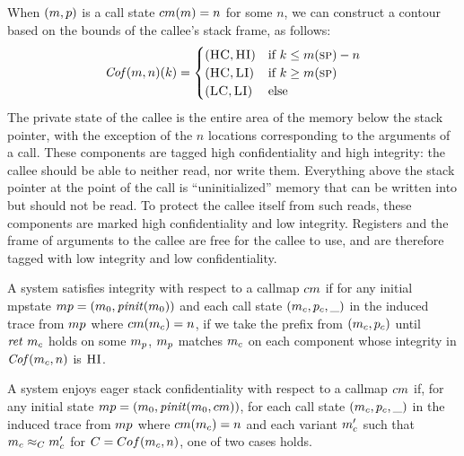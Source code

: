 \documentclass[acmsmall,review,anonymous]{acmart}\settopmatter{printfolios=true,printccs=false,printacmref=false}
\begin{document}
When \((m,p)\) is a call state \(cm(m) = n\)
for some \(n\), we can construct a contour based on the bounds of the
callee's stack frame, as follows:
\[\mathit{Cof}(m,n)(k) =
\begin{cases}
  (\textsc{HC},\textsc{HI}) & \text{if } k \leq m(\textsc{sp}) - n \\
  (\textsc{HC},\textsc{LI}) & \text{if } k \geq m(\textsc{sp}) \\
  (\textsc{LC},\textsc{LI}) & \text{else} \\
\end{cases}\]
%
The private state of the callee is the entire area of the memory below
the stack pointer, with the exception of the $n$ locations
corresponding to the arguments of a call. These components are tagged
high confidentiality and high integrity: the callee should be able to
neither read, nor write them.
%
Everything above the stack pointer at the point of the call is
``uninitialized'' memory that can be written into but should not be
read. To protect the callee itself from such reads, these components
are marked high confidentiality and low integrity.
%
Registers and the frame of arguments to the callee are free for the
callee to use, and are therefore tagged with low integrity and low
confidentiality. 



A system satisfies integrity with respect to a callmap \(cm\)
if for any initial mpstate \(mp =
(m_0,\mathit{pinit}(m_0))\) and each call state
\((m_c,p_c,\_)\) in the induced trace from \(mp\)
where \(cm(m_c) = n\), if we take the prefix from
\((m_c,p_c)\) until \(\mathit{ret}\ m_c\) holds on some
\(m_p\), \(m_p\) matches \(m_c\) on each component whose integrity
in \(\mathit{Cof}(m_c,n)\) is \(\textsc{HI}\).


A system enjoys eager stack confidentiality with respect to a callmap
\(cm\) if, for any initial state \(mp =
(m_0,\mathit{pinit}(m_0,cm))\), for each call state
\((m_c,p_c,\_)\) in the induced trace from \(mp\)
where \(cm(m_c) = n\) and each variant \(m_c'\) such that
\(m_c \approx_C m_c'\) for \(C = Cof(m_c, n)\),
one of two cases holds.
\end{document}
